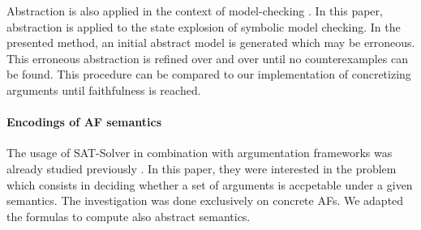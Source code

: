 Abstraction is also applied in the context of model-checking \cite{10.1145/876638.876643}. In this paper, abstraction is applied to the state explosion of symbolic model checking. In the presented method, an initial abstract model is generated which may be erroneous. This erroneous abstraction is refined over and over until no counterexamples can be found. This procedure can be compared to our implementation of concretizing arguments until faithfulness is reached.

\paragraph{Encodings of AF semantics} The usage of SAT-Solver in combination with argumentation frameworks was already studied previously \cite{inproceedingsBesnardDoutreBooleanFormulaSemantics}. In this paper, they were interested in the problem which consists in deciding whether a set of arguments is accpetable under a given semantics. The investigation was done exclusively on concrete AFs. We adapted the formulas to compute also abstract semantics.




